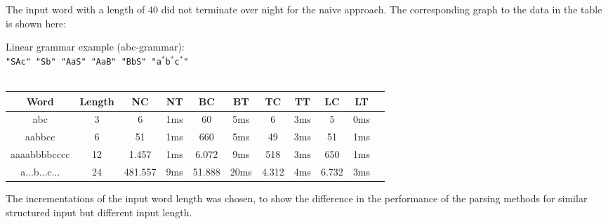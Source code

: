 \documentclass[a4paper, 11pt]{article}
\begin{document}
The input word with a length of 40 did not terminate over night for the naive approach. The corresponding graph to the data in the table is shown here:



Linear grammar example (abc-grammar): \\
\texttt{"SAc" "Sb" "AaS" "AaB" "BbS" "a$^*$b$^*$c$^*$"}
\ \\ \\
\begin{small}
\begin{tabular}{|c|c||c|c||c|c||c|c||c|c|c|}
\hline
Word & Length & NC & NT & BC & BT & TC & TT & LC & LT \\
\hline
\hline
abc & 3 & 6 & 1ms & 60 & 5ms & 6 & 3ms & 5 & 0ms \\
\hline
aabbcc & 6 & 51 & 1ms & 660 & 5ms & 49 & 3ms & 51 & 1ms \\
\hline
aaaabbbbcccc & 12 & 1.457 & 1ms & 6.072 & 9ms & 518 & 3ms & 650 & 1ms \\
\hline
a...b...c... & 24 & 481.557 & 9ms & 51.888 & 20ms & 4.312 & 4ms & 6.732 & 3ms \\
\hline
\end{tabular}
\end{small}

The incrementations of the input word length was chosen, to show the difference in the performance of the parsing methods for similar structured input but different input length.
\end{document}
